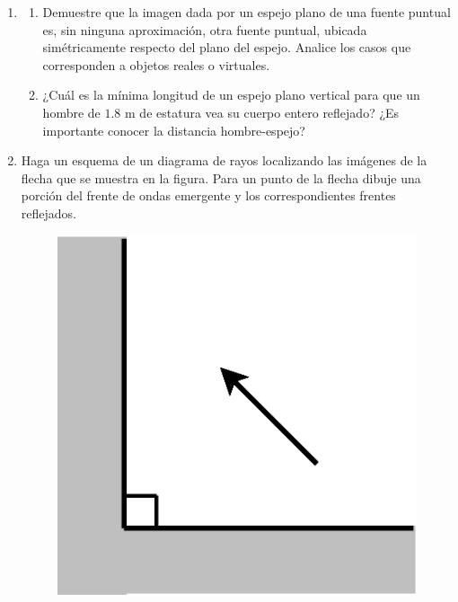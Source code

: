 \documentclass[11pt,spanish]{article}
\begin{document}
\begin{enumerate}

\section*{Espejos}


    \item 
    \begin{enumerate}
        \item Demuestre que la imagen dada por un espejo plano de una fuente
        puntual es, sin ninguna aproximación, otra fuente puntual, ubicada
        simétricamente respecto del plano del espejo. Analice los casos que
        corresponden a objetos reales o virtuales.
        
        \item ¿Cuál es la mínima longitud de un espejo plano vertical para que
        un hombre de $1.8$ m de estatura vea su cuerpo entero reflejado? ¿Es
        importante conocer la distancia hombre-espejo? 
    \end{enumerate}

    
    \item Haga un esquema de un diagrama de rayos localizando las imágenes de
    la flecha que se muestra en la figura. Para un punto de la flecha
    dibuje una porción del frente de ondas emergente y los correspondientes
    frentes reflejados.
    \begin{figure}[H]
        \centering{}\includegraphics[clip,scale=0.25]{figs/ej3-11}
    \end{figure}


\end{enumerate}
\end{document}
